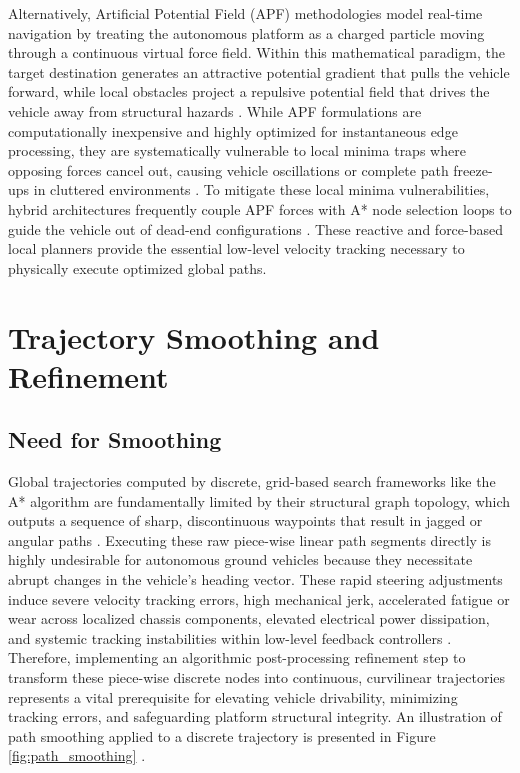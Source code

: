 Alternatively, Artificial Potential Field (APF) methodologies model real-time navigation by treating
the autonomous platform as a charged particle moving through a continuous virtual force field.
Within this mathematical paradigm, the target destination generates an attractive potential gradient
that pulls the vehicle forward, while local obstacles project a repulsive potential field that
drives the vehicle away from structural hazards \citep{Zafar_2018_methodologypath, Liu_2023_researchpathplanning}. While APF formulations are
computationally inexpensive and highly optimized for instantaneous edge processing, they are
systematically vulnerable to local minima traps where opposing forces cancel out, causing vehicle
oscillations or complete path freeze-ups in cluttered environments \citep{Zafar_2018_methodologypath, Liu_2023_researchpathplanning}. To
mitigate these local minima vulnerabilities, hybrid architectures frequently couple APF forces with
A* node selection loops to guide the vehicle out of dead-end configurations \citep{PerezdelPulgar_2023_enhancedhybrid}. These
reactive and force-based local planners provide the essential low-level velocity tracking necessary
to physically execute optimized global paths.

\section{Trajectory Smoothing and Refinement}

\subsection{Need for Smoothing}

Global trajectories computed by discrete, grid-based search frameworks like the A* algorithm are
fundamentally limited by their structural graph topology, which outputs a sequence of sharp,
discontinuous waypoints that result in jagged or angular paths \citep{Karur_2021_surveypath}. Executing these raw
piece-wise linear path segments directly is highly undesirable for autonomous ground vehicles
because they necessitate abrupt changes in the vehicle's heading vector. These rapid steering
adjustments induce severe velocity tracking errors, high mechanical jerk, accelerated fatigue or
wear across localized chassis components, elevated electrical power dissipation, and systemic
tracking instabilities within low-level feedback controllers \citep{Karur_2021_surveypath, Zhang_2021_mobilerobot, Xu_2024_precisepath}.
Therefore, implementing an algorithmic post-processing refinement step to transform these piece-wise
discrete nodes into continuous, curvilinear trajectories represents a vital prerequisite for
elevating vehicle drivability, minimizing tracking errors, and safeguarding platform structural
integrity. An illustration of path smoothing applied to a discrete trajectory is presented in Figure \ref{fig:path_smoothing} \citep{Song_2019_smoothedalgorithm}.

